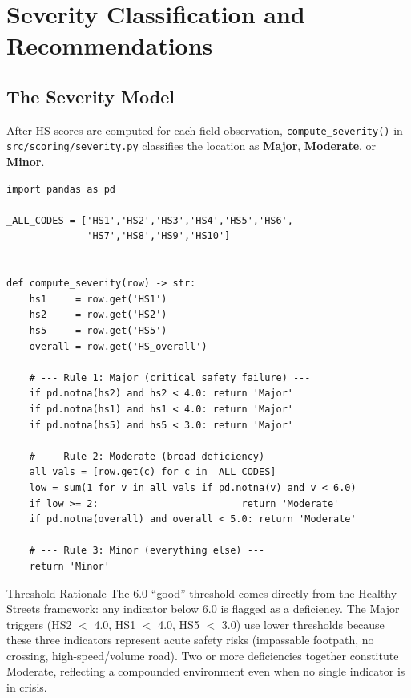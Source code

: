 \documentclass[11pt,a4paper,openany]{book}
\begin{document}
\chapter{Severity Classification and Recommendations}

\section{The Severity Model}

After HS scores are computed for each field observation, \texttt{compute\_severity()} in \texttt{src/scoring/severity.py} classifies the location as \textbf{Major}, \textbf{Moderate}, or \textbf{Minor}.

\begin{lstlisting}[style=python, caption={Full source: src/scoring/severity.py.}]
import pandas as pd

_ALL_CODES = ['HS1','HS2','HS3','HS4','HS5','HS6',
              'HS7','HS8','HS9','HS10']


def compute_severity(row) -> str:
    hs1     = row.get('HS1')
    hs2     = row.get('HS2')
    hs5     = row.get('HS5')
    overall = row.get('HS_overall')

    # --- Rule 1: Major (critical safety failure) ---
    if pd.notna(hs2) and hs2 < 4.0: return 'Major'
    if pd.notna(hs1) and hs1 < 4.0: return 'Major'
    if pd.notna(hs5) and hs5 < 3.0: return 'Major'

    # --- Rule 2: Moderate (broad deficiency) ---
    all_vals = [row.get(c) for c in _ALL_CODES]
    low = sum(1 for v in all_vals if pd.notna(v) and v < 6.0)
    if low >= 2:                         return 'Moderate'
    if pd.notna(overall) and overall < 5.0: return 'Moderate'

    # --- Rule 3: Minor (everything else) ---
    return 'Minor'
\end{lstlisting}

\begin{keybox}{Threshold Rationale}
The 6.0 ``good'' threshold comes directly from the Healthy Streets framework: any indicator below 6.0 is flagged as a deficiency. The Major triggers (HS2 $<$ 4.0, HS1 $<$ 4.0, HS5 $<$ 3.0) use lower thresholds because these three indicators represent acute safety risks (impassable footpath, no crossing, high-speed/volume road). Two or more deficiencies together constitute Moderate, reflecting a compounded environment even when no single indicator is in crisis.
\end{keybox}
\end{document}
